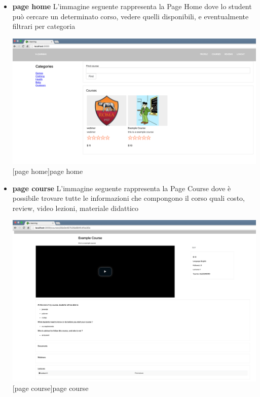 \begin{itemize}

\item \textbf{page home} L'immagine seguente rappresenta la Page Home dove lo student può cercare un determinato corso, vedere quelli disponibili, e eventualmente filtrari per categoria\par

\begin{minipage}{\linewidth}
    \centering
    \includegraphics[width=1.0\linewidth]{images/chapter4/page-home.png}
    [page home]{page home}
\end{minipage}


\item \textbf{page course} L'immagine seguente rappresenta la Page Course dove è possibile trovare tutte le informazioni che compongono il corso quali costo, review, video lezioni, materiale didattico \par
\begin{minipage}{\linewidth}
    \centering
    \includegraphics[width=1.0\linewidth]{images/chapter4/page-course.png}
    [page course]{page course}
\end{minipage}



\end{itemize}
